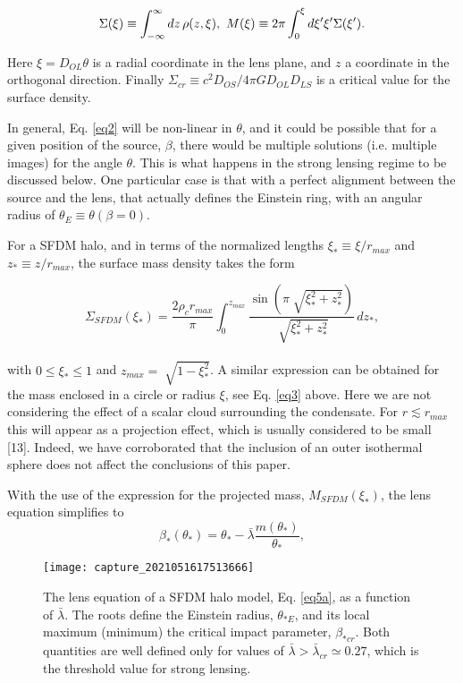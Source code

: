 \documentclass[10pt,a4paper]{article}
\begin{document}
\begin{multicols}{2}
\begin{equation}
\Sigma(\xi) \equiv \int_{-\infty}^{\infty} dz\,\rho(z,\xi),\hspace{0.12cm} M(\xi)\equiv 2\pi \int_{0}^{\xi} d\xi' \xi' \Sigma(\xi').
\label{eq3}
\end{equation}

Here $\xi = D_{OL}\theta$ is a radial coordinate in the lens plane, and $z$ a coordinate in the orthogonal direction. Finally $\Sigma_{cr} \equiv c^2D_{OS}/4\pi GD_{OL}D_{LS}$ is a critical value for the surface density.\

In general, Eq. \eqref{eq2} will be non-linear in $\theta$, and it could be possible that for a given position of the source, $\beta$, there would be multiple solutions (i.e. multiple images) for the angle $\theta$. This is what happens in the strong lensing regime to be discussed below. One particular case is that with a perfect alignment between the source and the lens,
that actually defines the Einstein ring, with an angular radius of $\theta_E \equiv \theta(\beta = 0).$\

For a SFDM halo, and in terms of the normalized lengths $\xi_{\ast} \equiv \xi/r_{max}$ and $z_{\ast} \equiv z/r_{max}$, the surface mass density takes the form

\begin{equation}
\Sigma_{SFDM}(\xi_{\ast}) = \frac{2\rho_{c}r_{max}}{\pi} \int_{0}^{z_{max}} \frac{\sin(\pi \sqrt[]{\xi_{\ast}^2 + z_{\ast}^{2}})}{\sqrt[]{\xi_{\ast}^2 + z_{\ast}^2}} \,dz_{\ast},
\label{eq4}
\end{equation}
\\
with $ 0 \leq \xi_{\ast} \leq 1$ and $z_{max} = \sqrt[]{1-\xi_{\ast}^2}$. A similar expression can be obtained for the mass enclosed in a circle or radius $\xi$, see Eq. \eqref{eq3} above. Here we are not considering the effect of a scalar cloud surrounding the condensate. For $r \lesssim r_{max}$ this will appear as a projection effect, which is usually considered to be small [13]. Indeed, we have corroborated that the inclusion of an outer isothermal sphere does not affect the conclusions of this paper.\

With the use of the expression for the projected mass, $M_{SFDM}(\xi_{\ast})$, the lens equation simplifies to
\begin{equation} \label{eq5a}
\beta_{\ast}(\theta_{\ast})=\theta_{\ast}-\bar{\lambda}\frac{m(\theta_{\ast})}{\theta_{\ast}} ,
\end{equation}

\begin{figure}[H]
\centering
\texttt{[image: capture\_2021051617513666]} 
\caption{The lens equation of a SFDM halo model, Eq. \eqref{eq5a}, as
a function of $\bar{\lambda}$. The roots define the Einstein radius, $\theta_{\ast E}$, and its local maximum (minimum) the critical impact parameter,
$\beta_{\ast cr}$. Both quantities are well defined only for values of $\bar{\lambda} >\bar{\lambda}_{cr} \simeq 0.27$, which is the threshold value for strong lensing.}
\end{figure}


\end{multicols}
\end{document}
